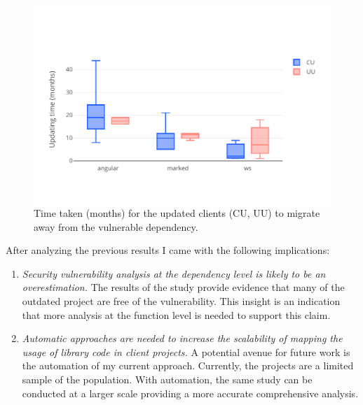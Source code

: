 \begin{figure}[ht]
\centering
\includegraphics[width=1\textwidth]{images/box.pdf}
\caption{Time taken (months) for the updated clients (CU, UU) to migrate away from the vulnerable dependency.}
\label{fig:results2}
\end{figure}

After analyzing the previous results I came with the following implications:
\begin{enumerate}
    \item \textit{Security vulnerability analysis at the dependency level is likely to be an overestimation.}
    The results of the study provide evidence that many of the outdated project are free of the vulnerability.
    This insight is an indication that more analysis at the function level is needed to support this claim.

    \item \textit{Automatic approaches are needed to increase the scalability of mapping the usage of library code in client projects. }
    A potential avenue for future work is the automation of my current approach.
    Currently, the projects are a limited sample of the population. 
    With automation, the same study can be conducted at a larger scale providing a more accurate comprehensive analysis.
\end{enumerate}
